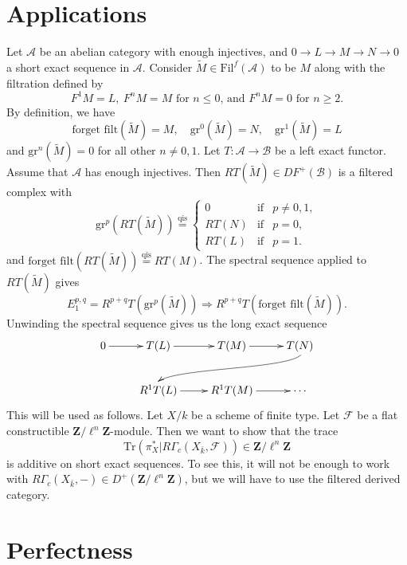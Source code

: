 \section{Applications}
\label{section-applications}

\noindent
Let $\mathcal{A}$ be an abelian category with enough injectives, and
$0 \to L \to M \to N \to 0$ a short exact sequence in $\mathcal{A}$.
Consider $\widetilde M \in \text{Fil}^f(\mathcal{A})$ to be $M$ along with the
filtration defined by
$$
F^1M = L, \ F^nM = M
\text{ for $n \leq 0$, and $F^nM = 0$ for $n \geq 2$.}
$$
By definition, we have
$$
\text{forget filt}(\widetilde M) = M, \quad
\text{gr}^0(\widetilde M) = N, \quad
\text{gr}^1(\widetilde M) = L
$$
and $\text{gr}^n(\widetilde M) = 0$ for all other $n \neq 0,1$. Let $T:
\mathcal{A} \to \mathcal{B}$ be a left exact functor. Assume that $\mathcal{A}$
has enough injectives. Then $RT(\widetilde M) \in D F^+(\mathcal{B})$ is a
filtered complex with
$$
\text{gr}^p(RT(\widetilde M)) \stackrel {\mathrm{qis}}{=} \left \{
\begin{matrix}
0 & \text{if} & p \neq 0,1, \\
RT(N) & \text{if} & p = 0, \\
RT(L) & \text{if} & p = 1.
\end{matrix}
\right .
$$
and $\text{forget filt}(RT(\widetilde M))\stackrel{\text{qis}}{ = } RT(M)$. The
spectral sequence applied to $RT(\widetilde M)$ gives
$$
E_1^{p,q} = R^{p+q}T(\mathrm{gr}^p(\widetilde M)) \Rightarrow
R^{p+q}T(\text{forget filt}(\widetilde M)).
$$
Unwinding the spectral sequence gives us the long exact sequence
$$
\xymatrix{
0 \ar[r] & T(L) \ar[r] & T(M) \ar[r] & T(N) \ar@(rd,ul)[rdllllr] \\
& R^1T(L) \ar[r] & R^1T(M) \ar[r] & \cdots
}
$$
This will be used as follows. Let $X/k$ be a scheme of finite type. Let
$\mathcal{F}$ be a flat constructible $\mathbf{Z}/\ell^n \mathbf{Z}$-module.
Then we want to show that the trace
$$
\text{Tr}( \pi_X^\ast | R\Gamma_c(X_{\bar k}, \mathcal{F})) \in
\mathbf{Z}/\ell^n \mathbf{Z}
$$
is additive on short exact sequences. To see this, it will not be enough to
work with $R\Gamma_c(X_{\bar k}, -) \in D^+(\mathbf{Z}/\ell^n \mathbf{Z})$, but
we will have to use the filtered derived category.







\section{Perfectness}
\label{section-perfect}

